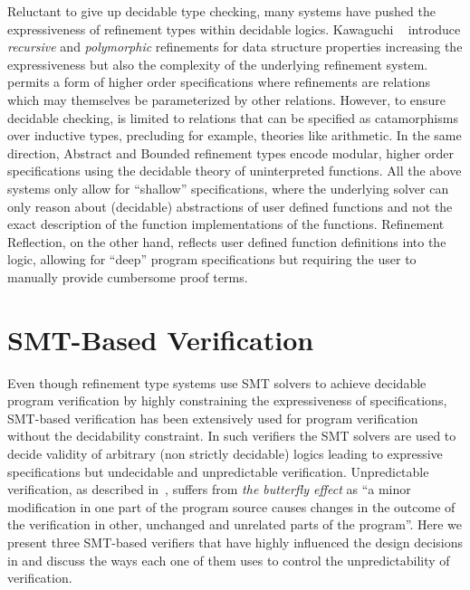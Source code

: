 
Reluctant to give up decidable type checking, 
many systems have pushed the expressiveness of refinement types
within decidable logics. 
%
Kawaguchi \etal~\cite{LiquidPLDI09} 
introduce \emph{recursive} and \emph{polymorphic} refinements for data
structure properties increasing the expressiveness but also the complexity 
of the underlying refinement system. 
%
\catalyst~\citep{catalyst} permits a form of
higher order specifications where refinements
are relations which may themselves be parameterized
by other relations.
%
However, to ensure decidable checking, \catalyst
is limited to relations that can be specified as
catamorphisms over inductive types, precluding
for example, theories like arithmetic.
%
In the same direction, Abstract and Bounded refinement types 
encode modular, higher order specifications 
using the decidable theory of uninterpreted functions. 
% 
All the above systems
only allow for ``shallow'' specifications, 
where the underlying solver can only reason about 
(decidable) abstractions of user defined functions 
and not the exact description of the function  implementations of the functions. 
%
Refinement Reflection, on the other hand, 
reflects user defined function definitions 
into the logic, allowing for ``deep'' program specifications
but requiring the user to manually provide cumbersome proof terms. 



\section{SMT-Based Verification}\label{related:smtbased}

Even though refinement type systems use SMT solvers to 
achieve decidable program verification by highly constraining the 
expressiveness of specifications,
%
SMT-based verification has been extensively used for program verification 
without the decidability constraint. 
%
In such verifiers the SMT solvers are used to decide validity of 
arbitrary (\ie non strictly decidable) logics leading to expressive specifications
but undecidable and unpredictable verification. 
Unpredictable verification, as described in~\cite{Leino16}, suffers from  
\textit{the butterfly effect} as ``a minor modification in one
part of the program source causes changes in the outcome of the verification in other,
unchanged and unrelated parts of the program''.
%
Here we present three SMT-based verifiers that have highly influenced 
the design decisions in \toolname 
and discuss the ways each one of them uses to control the unpredictability of verification. 



